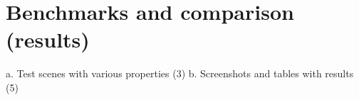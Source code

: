 
\chapter{Benchmarks and comparison (results)}

a.	Test scenes with various properties (3)
b.	Screenshots and tables with results (5)
